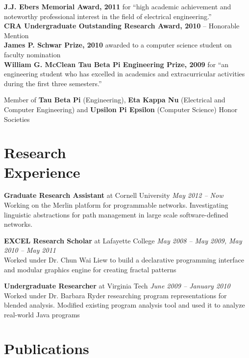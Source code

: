 \documentclass[margin,line]{resume}
\begin{document}
\begin{resume}
    {\bf J.J. Ebers Memorial Award, 2011} for ``high academic achievement and
    noteworthy professional interest in the field of electrical engineering.''\\
    {\bf CRA Undergraduate Outstanding Research Award, 2010} -- Honorable
    Mention \\
    {\bf James P. Schwar Prize, 2010} awarded to a computer science student on
    faculty nomination \\
    {\bf William G. McClean Tau Beta Pi Engineering Prize, 2009} for ``an
    engineering student who has excelled in academics and extracurricular
    activities during the first three semesters.''

    Member of {\bf Tau Beta Pi} (Engineering), {\bf Eta Kappa Nu} (Electrical
    and Computer Engineering) and {\bf Upsilon Pi Epsilon} (Computer Science)
    Honor Societies

    \section{Research\\Experience}

    {\bf Graduate Research Assistant} at Cornell University \hfill
    {\it May 2012 -- Now}\\
    Working on the Merlin platform for programmable networks. Investigating
    linguistic abstractions for path management in large scale software-defined
    networks.

    {\bf EXCEL Research Scholar} at Lafayette College \hfill
    {\it May 2008 -- May 2009, May 2010 -- May 2011}\\
    Worked under Dr. Chun Wai Liew to build a declarative programming interface
    and modular graphics engine for creating fractal patterns

    {\bf Undergraduate Researcher} at Virginia Tech \hfill
    {\it June 2009 -- January 2010}\\
    Worked under Dr. Barbara Ryder researching program representations for
    blended analysis. Modified existing program analysis tool and used it to
    analyze real-world Java programs


    \section{Publications}


\end{resume}
\end{document}
